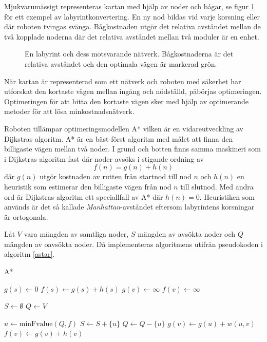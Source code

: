 \documentclass[11pt]{article}
\begin{document}
\begin{flushleft}
Mjukvarumässigt representeras kartan med hjälp av noder och bågar, se figur \ref{labToGraph} för ett exempel av labyrintkonvertering. En ny nod bildas vid varje korsning eller där roboten tvingas svänga. Bågkostnaden utgör det relativa avståndet mellan de två kopplade noderna där det relativa avståndet mellan två moduler är en enhet.

\begin{figure}[htbp]
\centering
\noindent\resizebox{.6\linewidth}{!}{
	}
	\caption{En labyrint och dess motsvarande nätverk. Bågkostnaderna är det relativa avståndet och den optimala vägen är markerad grön.\label{labToGraph}}	
\end{figure}

När kartan är representerad som ett nätverk och roboten med säkerhet har utforskat den kortaste vägen mellan ingång och nödställd, påbörjas optimeringen. Optimeringen för att hitta den kortaste vägen sker med hjälp av optimerande metoder för att lösa minkostnadsnätverk.

Roboten tillämpar optimeringsmodellen A* vilken är en vidareutveckling av Dijkstras algoritm. A* är en bäst-först algoritm med målet att finna den billigaste vägen mellan två noder. I grund och botten finns samma maskineri som i Dijkstras algoritm fast där noder avsöks i stigande ordning av
\begin{equation*}
	f(n) = g(n) + h(n)
\end{equation*}
där $g(n)$ utgör kostnaden av rutten från startnod till nod $n$ och $h(n)$ en heuristik som estimerar den billigaste vägen från nod $n$ till slutnod. Med andra ord är Dijkstras algoritm ett speciallfall av A* där $h(n) = 0$. Heuristiken som används är det så kallade \emph{Manhattan}-avståndet eftersom labyrintens korsningar är ortogonala.

Låt $V$ vara mängden av samtliga noder, $S$ mängden av avsökta noder och $Q$ mängden av oavsökta noder. Då implementeras algoritmens utifrån pseudokoden i algoritm \ref{astar}.

\begin{algorithm}[H]
	\caption{A*} \label{astar}
	\begin{algorithmic}[1]
			\State $g(s) \gets 0$
			\State $f(s) \gets g(s) + h(s)$
				\State $g(v) \gets \infty$
				\State $f(v) \gets \infty$
			\EndFor
			
			\State $S \gets \emptyset$
			\State $Q \gets V$
			
				\State $u \gets \textrm{minFvalue}(Q,f)$%
				\State $S \gets S +  \{ u\}$
				\State $Q \gets Q - \{ u\}$
						\State $g(v) \gets g(u) + w(u,v)$
						\State $f(v) \gets g(v) + h(v)$
					\EndIf
				\EndFor
			\EndWhile
			

\end{algorithmic}
\end{algorithm}
\end{flushleft}
\end{document}
